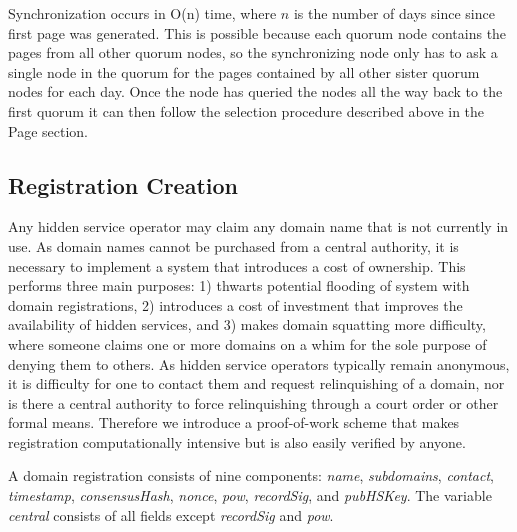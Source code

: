 Synchronization occurs in O(n) time, where $ n $ is the number of days since since first page was generated. This is possible because each quorum node contains the pages from all other quorum nodes, so the synchronizing node only has to ask a single node in the quorum for the pages contained by all other sister quorum nodes for each day. Once the node has queried the nodes all the way back to the first quorum it can then follow the selection procedure described above in the Page section.

\subsection{Registration Creation}

Any hidden service operator may claim any domain name that is not currently in use. As domain names cannot be purchased from a central authority, it is necessary to implement a system that introduces a cost of ownership. This performs three main purposes: 1) thwarts potential flooding of system with domain registrations, 2) introduces a cost of investment that improves the availability of hidden services, and 3) makes domain squatting more difficulty, where someone claims one or more domains on a whim for the sole purpose of denying them to others. As hidden service operators typically remain anonymous, it is difficulty for one to contact them and request relinquishing of a domain, nor is there a central authority to force relinquishing through a court order or other formal means. Therefore we introduce a proof-of-work scheme that makes registration computationally intensive but is also easily verified by anyone.

A domain registration consists of nine components: \textit{name}, \textit{subdomains}, \textit{contact}, \textit{timestamp}, \textit{consensusHash}, \textit{nonce}, \textit{pow}, \textit{recordSig}, and \textit{pubHSKey}. The variable \textit{central} consists of all fields except \textit{recordSig} and \textit{pow}.

